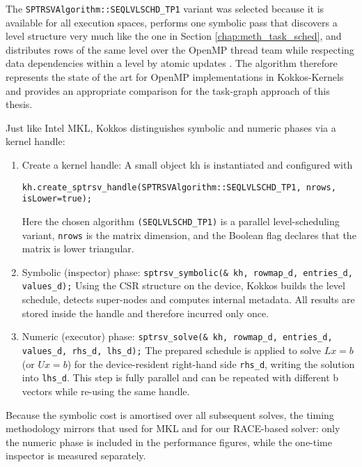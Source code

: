 The \texttt{SPTRSVAlgorithm::SEQLVLSCHD\_TP1} variant was selected
because it is available for all execution spaces, performs one symbolic pass that discovers a level structure very much like the one in Section \ref{chap:meth_task_sched}, and distributes rows of the same level over the OpenMP thread team while respecting data dependencies within a level by atomic updates \cite{rajamanickam2021kokkoskernelsperformanceportable}.
The algorithm therefore represents the state of the art for OpenMP implementations in Kokkos-Kernels and provides an
appropriate comparison for the task-graph approach of this thesis.

Just like Intel MKL, Kokkos distinguishes symbolic and
numeric phases via a kernel handle:

\begin{enumerate}
    \item Create a kernel handle: A small object kh is instantiated and configured with
          
          \texttt{kh.create\_sptrsv\_handle(SPTRSVAlgorithm::SEQLVLSCHD\_TP1, nrows, isLower=true);}
          
          Here the chosen algorithm \texttt{(SEQLVLSCHD\_TP1)} is a parallel level-scheduling
          variant, \texttt{nrows} is the matrix dimension, and the Boolean flag declares that
          the matrix is lower triangular.
    \item Symbolic (inspector) phase: \texttt{sptrsv\_symbolic(\& kh, rowmap\_d, entries\_d, values\_d);}
          Using the CSR structure on the device, Kokkos builds the level
          schedule, detects super-nodes and computes internal metadata.  All
          results are stored inside the handle and therefore incurred only once.
    \item Numeric (executor) phase: \texttt{sptrsv\_solve(\& kh, rowmap\_d, entries\_d, values\_d, rhs\_d, lhs\_d);}
          The prepared schedule is applied to solve $Lx=b$ (or $Ux=b$)
          for the device-resident right-hand side \texttt{rhs\_d}, writing the solution
          into \texttt{lhs\_d}.  This step is fully parallel and can be repeated
          with different b vectors while re-using the same handle.
\end{enumerate}
Because the symbolic cost is amortised over all subsequent solves, the
timing methodology mirrors that used for MKL and for our
RACE-based solver: only the numeric phase is included in the
performance figures, while the one-time inspector is measured
separately.

